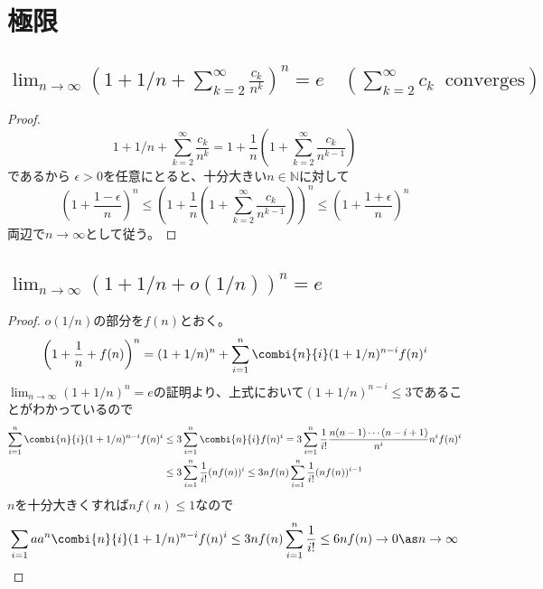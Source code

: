     \section{極限}
        \subsection{\texorpdfstring{$\lim_{n\rightarrow\infty}\left(1+1/n+\sum_{k=2}^\infty\frac{c_k}{n^k}\right)^n = e\quad(\sum_{k=2}^\infty c_k\;\;\mathrm{converges})$}{lim\_\{n→∞\} (1 + 1/n + Σ\_\{k=2\}\string^∞ c\_k/n\string^k)\string^n = e (Σ\_\{k=2→∞\}c\_k converges)}}
            \begin{proof}
                \quad\par
                \[1+1/n+\sum_{k=2}^\infty\frac{c_k}{n^k} = 1+\frac{1}{n}\left(1+\sum_{k=2}^\infty\frac{c_k}{n^{k-1}}\right)\]
                であるから
                $\epsilon>0$を任意にとると、十分大きい$n\in\mathbb{N}$に対して
                \[\left(1+\frac{1-\epsilon}{n}\right)^n \leq \left(1+\frac{1}{n}\left(1+\sum_{k=2}^\infty\frac{c_k}{n^{k-1}}\right)\right)^n \leq \left(1+\frac{1+\epsilon}{n}\right)^n\]
                両辺で$n\rightarrow\infty$として従う。
            \end{proof}
        \subsection{\texorpdfstring{$\lim_{n\rightarrow\infty}\left(1+1/n+o(1/n)\right)^n = e$}{lim\_\{n→∞\} (1+1/n+o(1/n))\string^n = e}}
            \begin{proof}
                \quad\par
                $o(1/n)$の部分を$f(n)$とおく。
                \[ \left(1+\frac{1}{n}+f(n)\right)^n = (1+1/n)^n + \sum_{i=1}^n \combi{n}{i}(1+1/n)^{n-i}f(n)^i \]
                $\lim_{n\to\infty}(1+1/n)^n = e$の証明より、上式において$(1+1/n)^{n-i}\leq 3$であることがわかっているので
                \begin{align*}
                    \sum_{i=1}^n \combi{n}{i}(1+1/n)^{n-i}f(n)^i &\leq 3\sum_{i=1}^n \combi{n}{i}f(n)^i = 3\sum_{i=1}^n \frac{1}{i!}\frac{n(n-1)\dotsm(n-i+1)}{n^i}n^if(n)^i \\
                    &\leq 3\sum_{i=1}^n \frac{1}{i!}(nf(n))^i \leq 3nf(n)\sum_{i=1}^n \frac{1}{i!}(nf(n))^{i-1}
                \end{align*}
                $n$を十分大きくすれば$nf(n)\leq 1$なので
                \[ \sum_{i=1}aa^n \combi{n}{i}(1+1/n)^{n-i}f(n)^i \leq 3nf(n)\sum_{i=1}^n \frac{1}{i!} \leq 6nf(n) \to 0 \as n\to\infty \]
            \end{proof}
